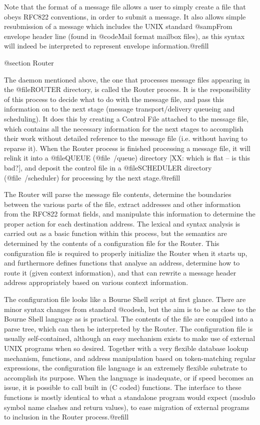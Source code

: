 Note that the format of a message file allows a user to simply create a file
that obeys RFC822 conventions, in order to submit a message. It also allows
simple resubmission of a message which includes the UNIX standard @samp{From }
envelope header line (found in @code{Mail} format mailbox files), as this
syntax will indeed be interpreted to represent envelope information.@refill

@section Router

The daemon mentioned above, the one that processes message files
appearing in the @file{ROUTER} directory, is called the Router process.
It is the responsibility of this process to decide what to do with the
message file, and pass this information on to the next stage (message
transport/delivery queueing and scheduling). It does this by creating a
Control File attached to the message file, which contains all the
necessary information for the next stages to accomplish their work
without detailed reference to the message file (i.e.  without having to
reparse it). When the Router process is finished processing a message
file, it will relink it into a @file{QUEUE} (@file{~/queue}) directory
[XX: which is flat -- is this bad?], and deposit the control file in a
@file{SCHEDULER} directory (@file{~/scheduler}) for processing by the
next stage.@refill

The Router will parse the message file contents, determine the boundaries
between the various parts of the file, extract addresses and other
information from the RFC822 format fields, and manipulate this information to
determine the proper action for each destination address. The lexical and
syntax analysis is carried out as a basic function within this process, but
the semantics are determined by the contents of a configuration file for the
Router. This configuration file is required to properly initialize the Router
when it starts up, and furthermore defines functions that analyse an address,
determine how to route it (given context information), and that can rewrite
a message header address appropriately based on various context information.

The configuration file looks like a Bourne Shell script at first glance.
There are minor syntax changes from standard @code{sh}, but the aim is to be as
close to the Bourne Shell language as is practical. The contents of the file
are compiled into a parse tree, which can then be interpreted by the Router.
The configuration file is usually self-contained, although an easy mechanism
exists to make use of external UNIX programs when so desired. Together with
a very flexible database lookup mechanism, functions, and address
manipulation based on token-matching regular expressions, the configuration
file language is an extremely flexible substrate to accomplish its
purpose. When the language is inadequate, or if speed becomes an issue, it is
possible to call built in (C coded) functions. The interface to these
functions is mostly identical to what a standalone program would expect
(modulo symbol name clashes and return values), to ease migration of external
programs to inclusion in the Router process.@refill

